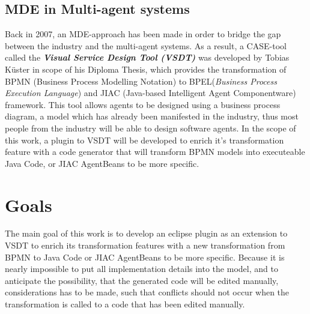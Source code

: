\subsection{MDE in Multi-agent systems}
Back in 2007, an MDE-approach has been made in order to bridge the gap between the industry and the multi-agent systems. As a result, a CASE-tool called the \textbf{\textit{Visual Service Design Tool (VSDT)}} was developed by Tobias K\"uster in scope of his Diploma Thesis, which provides the transformation of BPMN (Business Process Modelling Notation) to BPEL(\textit{Business Process Execution Language}) and JIAC (Java-based Intelligent Agent Componentware) framework. This tool allows agents to be designed using a business process diagram, a model which has already been manifested in the industry, thus most people from the industry will be able to design software agents. In the scope of this work, a plugin to VSDT will be developed to enrich it's transformation feature with a code generator that will transform BPMN models into executeable Java Code, or JIAC AgentBeans to be more specific. 

\section{Goals}
\label{sec:Goals}
The main goal of this work is to develop an eclipse plugin as an extension to VSDT to enrich its transformation features with a new transformation from BPMN to Java Code or JIAC AgentBeans to be more specific. Because it is nearly impossible to put all implementation  details into the model, and to anticipate the possibility, that the generated code will be edited manually, considerations has to be made, such that conflicts should not occur when the transformation is called to a code that has been edited manually. 


